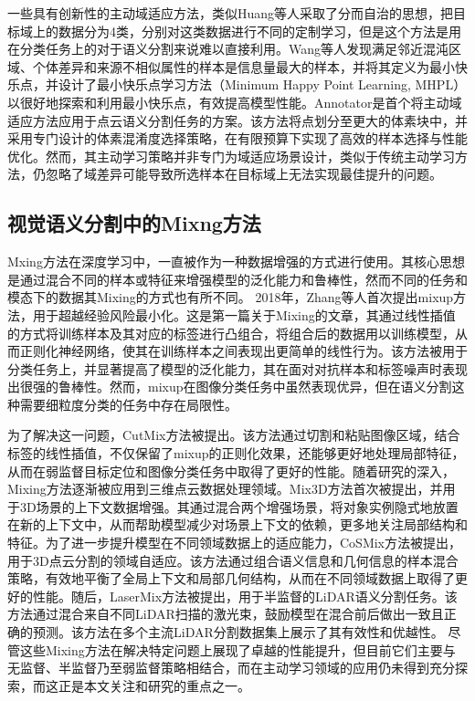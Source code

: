 一些具有创新性的主动域适应方法，类似Huang等人采取了分而自治的思想，把目标域上的数据分为4类，分别对这类数据进行不同的定制学习，但是这个方法是用在分类任务上的对于语义分割来说难以直接利用。Wang等人发现满足邻近混沌区域、个体差异和来源不相似属性的样本是信息量最大的样本，并将其定义为最小快乐点，并设计了最小快乐点学习方法（Minimum Happy Point Learning, MHPL）以很好地探索和利用最小快乐点，有效提高模型性能。Annotator是首个将主动域适应方法应用于点云语义分割任务的方案。该方法将点划分至更大的体素块中，并采用专门设计的体素混淆度选择策略，在有限预算下实现了高效的样本选择与性能优化。然而，其主动学习策略并非专门为域适应场景设计，类似于传统主动学习方法，仍忽略了域差异可能导致所选样本在目标域上无法实现最佳提升的问题。

\subsection{视觉语义分割中的Mixng方法}
Mxing方法在深度学习中，一直被作为一种数据增强的方式进行使用。其核心思想是通过混合不同的样本或特征来增强模型的泛化能力和鲁棒性，然而不同的任务和模态下的数据其Mixing的方式也有所不同。
2018年，Zhang等人首次提出mixup方法，用于超越经验风险最小化。这是第一篇关于Mixing的文章，其通过线性插值的方式将训练样本及其对应的标签进行凸组合，将组合后的数据用以训练模型，从而正则化神经网络，使其在训练样本之间表现出更简单的线性行为。该方法被用于分类任务上，并显著提高了模型的泛化能力，其在面对对抗样本和标签噪声时表现出很强的鲁棒性。然而，mixup在图像分类任务中虽然表现优异，但在语义分割这种需要细粒度分类的任务中存在局限性。

为了解决这一问题，CutMix方法被提出。该方法通过切割和粘贴图像区域，结合标签的线性插值，不仅保留了mixup的正则化效果，还能够更好地处理局部特征，从而在弱监督目标定位和图像分类任务中取得了更好的性能。随着研究的深入，Mixing方法逐渐被应用到三维点云数据处理领域。Mix3D方法首次被提出，并用于3D场景的上下文数据增强。其通过混合两个增强场景，将对象实例隐式地放置在新的上下文中，从而帮助模型减少对场景上下文的依赖，更多地关注局部结构和特征。为了进一步提升模型在不同领域数据上的适应能力，CoSMix方法被提出，用于3D点云分割的领域自适应。该方法通过组合语义信息和几何信息的样本混合策略，有效地平衡了全局上下文和局部几何结构，从而在不同领域数据上取得了更好的性能。随后，LaserMix方法被提出，用于半监督的LiDAR语义分割任务。该方法通过混合来自不同LiDAR扫描的激光束，鼓励模型在混合前后做出一致且正确的预测。该方法在多个主流LiDAR分割数据集上展示了其有效性和优越性。
尽管这些Mixing方法在解决特定问题上展现了卓越的性能提升，但目前它们主要与无监督、半监督乃至弱监督策略相结合，而在主动学习领域的应用仍未得到充分探索，而这正是本文关注和研究的重点之一。

